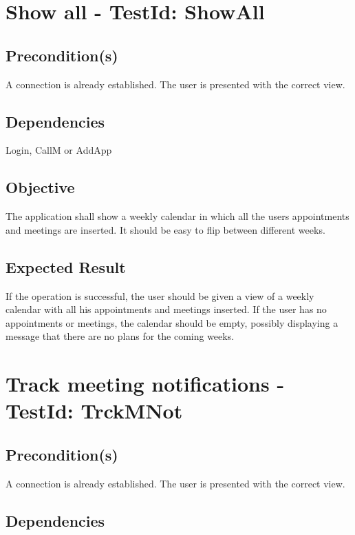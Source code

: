 \documentclass{article}
\begin{document}
\section{Show all - TestId: ShowAll}

\subsection{Precondition(s)}

A connection is already established. The user is presented with the correct
view.

\subsection{Dependencies}

Login, CallM or AddApp

\subsection{Objective}

The application shall show a weekly calendar in which all the users
appointments and meetings are inserted. It should be easy to flip between
different weeks.

\subsection{Expected Result}

If the operation is successful, the user should be given a view of a weekly
calendar with all his appointments and meetings inserted. If the user has no
appointments or meetings, the calendar should be empty, possibly displaying
a message that there are no plans for the coming weeks. \newpage

\section{Track meeting notifications - TestId: TrckMNot}

\subsection{Precondition(s)}

A connection is already established. The user is presented with the correct
view.

\subsection{Dependencies}
\end{document}
